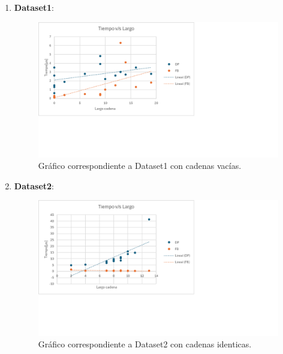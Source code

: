 \begin{enumerate}
    \item \textbf{Dataset1}: 
    \begin{figure}[H]
        \centering
        \includegraphics[width=\textwidth]{tikz/Grafico1.png}
        \caption{Gráfico correspondiente a Dataset1 con cadenas vacías.}
        \label{fig:dataset1}
    \end{figure}

    \item \textbf{Dataset2}: 
    \begin{figure}[H]
        \centering
        \includegraphics[width=\textwidth]{tikz/Grafico2.png}
        \caption{Gráfico correspondiente a Dataset2 con cadenas identicas.}
        \label{fig:dataset2}
    \end{figure}


\end{enumerate}
